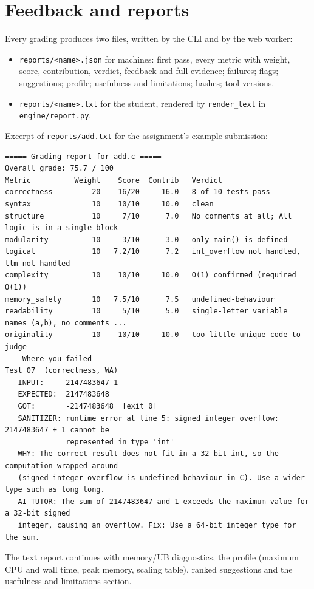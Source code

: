 \documentclass[11pt,a4paper]{article}
\newcommand{\file}[1]{\nolinkurl{#1}}
\newcommand{\fn}[1]{\nolinkurl{#1}}
\begin{document}
\section{Feedback and reports}
Every grading produces two files, written by the CLI and by the web worker:
\begin{itemize}
  \item \file{reports/<name>.json} for machines: first pass, every metric with weight, score, contribution, verdict,
        feedback and full evidence; failures; flags; suggestions; profile; usefulness and limitations; hashes; tool versions.
  \item \file{reports/<name>.txt} for the student, rendered by \fn{render_text} in \file{engine/report.py}.
\end{itemize}

Excerpt of \file{reports/add.txt} for the assignment's example submission:
\begin{lstlisting}
===== Grading report for add.c =====
Overall grade: 75.7 / 100
Metric          Weight    Score  Contrib   Verdict
correctness         20    16/20     16.0   8 of 10 tests pass
syntax              10    10/10     10.0   clean
structure           10     7/10      7.0   No comments at all; All logic is in a single block
modularity          10     3/10      3.0   only main() is defined
logical             10   7.2/10      7.2   int_overflow not handled, llm not handled
complexity          10    10/10     10.0   O(1) confirmed (required O(1))
memory_safety       10   7.5/10      7.5   undefined-behaviour
readability         10     5/10      5.0   single-letter variable names (a,b), no comments ...
originality         10    10/10     10.0   too little unique code to judge
--- Where you failed ---
Test 07  (correctness, WA)
   INPUT:     2147483647 1
   EXPECTED:  2147483648
   GOT:       -2147483648  [exit 0]
   SANITIZER: runtime error at line 5: signed integer overflow: 2147483647 + 1 cannot be
              represented in type 'int'
   WHY: The correct result does not fit in a 32-bit int, so the computation wrapped around
   (signed integer overflow is undefined behaviour in C). Use a wider type such as long long.
   AI TUTOR: The sum of 2147483647 and 1 exceeds the maximum value for a 32-bit signed
   integer, causing an overflow. Fix: Use a 64-bit integer type for the sum.
\end{lstlisting}
The text report continues with memory/UB diagnostics, the profile (maximum CPU and wall time, peak memory,
scaling table), ranked suggestions and the usefulness and limitations section.
\end{document}
